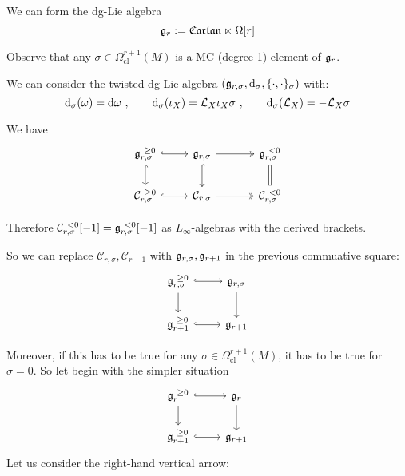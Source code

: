 \documentclass[beamer,10pt]{standalone}
\begin{document}
\begin{frame}
	We can form the dg-Lie algebra
	$$ \mathfrak{g}_r := \mathfrak{Cartan} \ltimes \Omega[r]$$
	\vfill

	Observe that any $\sigma \in \Omega^{r+1}_{\mathrm{cl}}(M)$ is a MC (degree 1) element of $\mathfrak{g}_r$.
	\vfill
	
	We can consider the twisted dg-Lie algebra $(\mathfrak{g}_{r,\sigma}, \mathrm{d}_\sigma, \lbrace \cdot,\cdot\rbrace_\sigma)$ with:
	\begin{displaymath}
		\mathrm{d}_\sigma (\omega) = \mathrm{d} \omega~, \qquad
		\mathrm{d}_\sigma (\iota_X) = \mathcal{L}_X \iota_X \sigma~, \qquad
		\mathrm{d}_\sigma(\mathcal{L}_X) = -\mathcal{L}_X\sigma
	\end{displaymath}
	\vfill

	We have
	\begin{displaymath}
		\begin{tikzcd}[ampersand replacement=\&]
			\g_{r,\sigma}^{~\geq 0} \ar[r,hook] \ar[d,hook] \&
			\g_{r,\sigma} \ar[d,hook] \ar[r,two heads] \&[1em]
			\g_{r,\sigma}^{~< 0} \ar[d,equal] \\
			\mathcal{C}_{r,\sigma}^{~\geq 0} \ar[r,hook] \&
			\mathcal{C}_{r,\sigma} \ar[r,two heads] \&
			\mathcal{C}_{r,\sigma}^{~< 0}
		\end{tikzcd}
	\end{displaymath}
	\vfill

	Therefore $\mathcal{C}_{r,\sigma}^{~< 0}[-1] = \mathfrak{g}_{r,\sigma}^{~<0}[-1]$ as $L_\infty$-algebras with the derived brackets.
\end{frame}

\begin{frame}
  So we can replace $\mathcal{C}_{r,\sigma}, \mathcal{C}_{r+1}$ with $\mathfrak{g}_{r,\sigma}, \mathfrak{g}_{r+1}$ in the previous commuative square:
	\begin{displaymath}
		\begin{tikzcd}[ampersand replacement=\&]
			\g_{r,\sigma}^{~\geq 0} \ar[r,hook] \ar[d, ]
			\& \g_{r,\sigma} \ar[d, ]
			\\
			\g_{r+1}^{~\geq 0} \ar[r,hook] \& \g_{r+1}
		\end{tikzcd}
	\end{displaymath}
	\vfill

	Moreover, if this has to be true for any $\sigma \in \Omega^{r+1}_{\mathrm{cl}}(M)$, it has to be true for $\sigma = 0$. So let begin with the simpler situation
	\begin{displaymath}
		\begin{tikzcd}[ampersand replacement=\&]
			\g_{r}^{~\geq 0} \ar[r,hook] \ar[d, ]
			\& \g_{r} \ar[d, ]
			\\
			\g_{r+1}^{~\geq 0} \ar[r,hook] \& \g_{r+1}
		\end{tikzcd}
	\end{displaymath}
	\vfill
	Let us consider the right-hand vertical arrow:
\end{frame}
\end{document}
